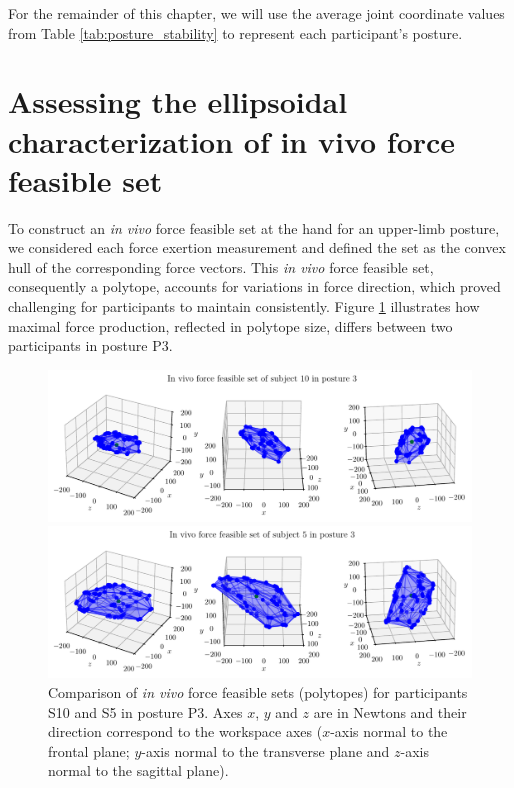 For the remainder of this chapter, we will use the average joint coordinate values from Table \ref{tab:posture_stability} to represent each participant's posture.

\section{Assessing the ellipsoidal characterization of in vivo force feasible set}
\label{sec:experimental_reconstruction}
To construct an \emph{in vivo} force feasible set at the hand for an upper-limb posture, we considered each force exertion measurement and defined the set as the convex hull of the corresponding force vectors. This \emph{in vivo} force feasible set, consequently a polytope, accounts for variations in force direction, which proved challenging for participants to maintain consistently. Figure \ref{fig:in_vivo_ffs_example_posture3} illustrates how maximal force production, reflected in polytope size, differs between two participants in posture P3.

\begin{figure}[!htb]
    \centering
    \captionsetup{justification=centering}
    
    \begin{minipage}{1\linewidth}
        \captionsetup{justification=centering}
        \centering
        \includegraphics[trim={0 0 0 0}, clip, width=1\linewidth]{img/chapter_5/subject_21_ffs_posture_3.pdf}
    \end{minipage}

    \begin{minipage}{1\linewidth}
        \captionsetup{justification=centering}
        \centering
        \includegraphics[trim={0 0 0 0}, clip, width=1\linewidth]{img/chapter_5/subject_296_ffs_posture_3.pdf}
    \end{minipage}
    \caption{Comparison of \emph{in vivo} force feasible sets (polytopes) for participants S10 and S5 in posture P3. Axes $x$, $y$ and $z$ are in Newtons and their direction correspond to the workspace axes ($x$-axis normal to the frontal plane; $y$-axis normal to the transverse plane and $z$-axis normal to the sagittal plane).}
    \label{fig:in_vivo_ffs_example_posture3}
\end{figure}

